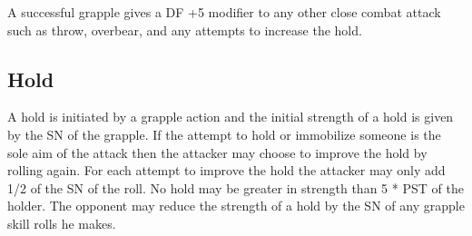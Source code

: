 A successful grapple gives a DF +5 modifier to any other close combat 
attack such as throw, overbear, and any attempts to increase the hold.

\subsection{Hold}

A hold is initiated by a grapple action and the initial strength of a
hold is given by the SN of the grapple. If the attempt to hold or 
immobilize someone is the sole aim of the attack then the attacker 
may choose to improve the hold by rolling again. For each attempt to 
improve the hold the attacker may only add 1/2 of the SN of the roll. 
No hold may be greater in strength than 5 * PST of the holder.
The opponent may reduce the strength of a hold by the SN of any 
grapple skill rolls he makes.

